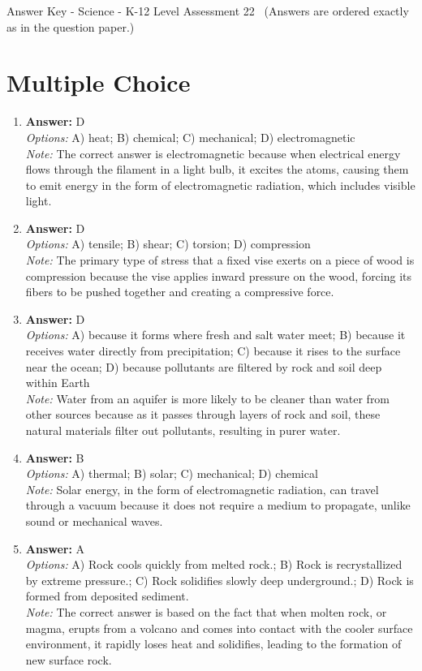 \documentclass[12pt]{article}
\begin{document}
\begin{center}
Answer Key - Science - K-12 Level Assessment 22 \
\small (Answers are ordered exactly as in the question paper.)
\end{center}

\section*{Multiple Choice}
\begin{enumerate}[label=\arabic*.]
\item \textbf{Answer:} D
\\ \textit{Options:} A) heat; B) chemical; C) mechanical; D) electromagnetic
\\ \textit{Note:} The correct answer is electromagnetic because when electrical energy flows through the filament in a light bulb, it excites the atoms, causing them to emit energy in the form of electromagnetic radiation, which includes visible light.
\item \textbf{Answer:} D
\\ \textit{Options:} A) tensile; B) shear; C) torsion; D) compression
\\ \textit{Note:} The primary type of stress that a fixed vise exerts on a piece of wood is compression because the vise applies inward pressure on the wood, forcing its fibers to be pushed together and creating a compressive force.
\item \textbf{Answer:} D
\\ \textit{Options:} A) because it forms where fresh and salt water meet; B) because it receives water directly from precipitation; C) because it rises to the surface near the ocean; D) because pollutants are filtered by rock and soil deep within Earth
\\ \textit{Note:} Water from an aquifer is more likely to be cleaner than water from other sources because as it passes through layers of rock and soil, these natural materials filter out pollutants, resulting in purer water.
\item \textbf{Answer:} B
\\ \textit{Options:} A) thermal; B) solar; C) mechanical; D) chemical
\\ \textit{Note:} Solar energy, in the form of electromagnetic radiation, can travel through a vacuum because it does not require a medium to propagate, unlike sound or mechanical waves.
\item \textbf{Answer:} A
\\ \textit{Options:} A) Rock cools quickly from melted rock.; B) Rock is recrystallized by extreme pressure.; C) Rock solidifies slowly deep underground.; D) Rock is formed from deposited sediment.
\\ \textit{Note:} The correct answer is based on the fact that when molten rock, or magma, erupts from a volcano and comes into contact with the cooler surface environment, it rapidly loses heat and solidifies, leading to the formation of new surface rock.
\end{enumerate}
\end{document}
